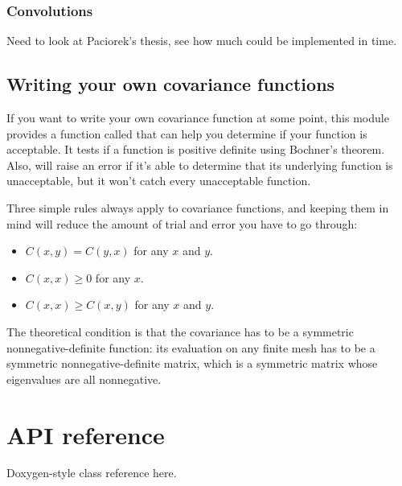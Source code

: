\documentclass{manual}
\begin{document}
\subsection{Convolutions}\label{sub:convolutions}
Need to look at Paciorek's thesis, see how much could be implemented in time.


\section{Writing your own covariance functions}\label{sec:usercov} %
If you want to write your own covariance function at some point, this module provides a function called  that can help you determine if your function is acceptable. It tests if a function is positive definite using Bochner's theorem. Also,  will raise an error if it's able to determine that its underlying function is unacceptable, but it won't catch every unacceptable function. 

Three simple rules always apply to covariance functions, and keeping them in mind will reduce the amount of trial and error you have to go through:
\begin{itemize}
	\item $C(x,y)=C(y,x)$ for any $x$ and $y$.
	\item $C(x,x) \ge 0$ for any $x$.
	\item $C(x,x)\ge C(x,y)$ for any $x$ and $y$.
\end{itemize}

The theoretical condition is that the covariance has to be a symmetric nonnegative-definite function: its evaluation on any finite mesh has to be a symmetric nonnegative-definite matrix, which is a symmetric matrix whose eigenvalues are all nonnegative.



\chapter{API reference}\label{cha:reference} 

Doxygen-style class reference here.
\end{document}
